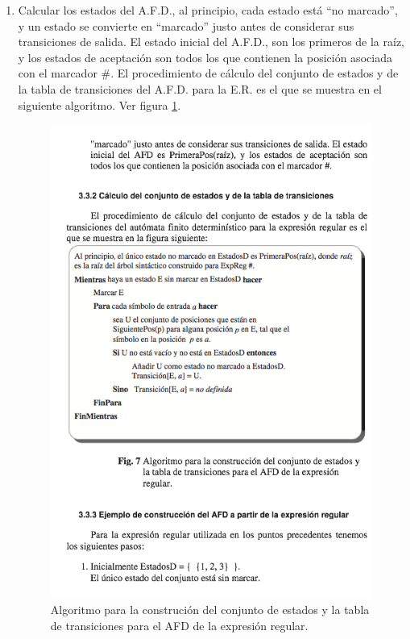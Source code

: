 \documentclass{report}
\begin{document}
\begin{enumerate}
	\item Calcular los estados del A.F.D., al principio, cada estado está “no marcado”, y un estado se convierte en “marcado” justo antes de considerar sus transiciones de salida. El estado inicial del A.F.D., son los primeros de la raíz, y los estados de aceptación son todos los que contienen la posición asociada con el marcador \#. El procedimiento de cálculo del conjunto de estados y de la tabla de transiciones del A.F.D. para la E.R. es el que se muestra en el siguiente algoritmo. Ver figura \ref{fig:algoritmo}.

	\begin{figure}
		\centering
		\includegraphics[scale=.5]{img/tabla3.png}
		\caption{Algoritmo para la construción del conjunto de estados y la tabla de transiciones para el AFD de la expresión regular.}
		\label{fig:algoritmo}
	\end{figure}

\end{enumerate}
\end{document}

